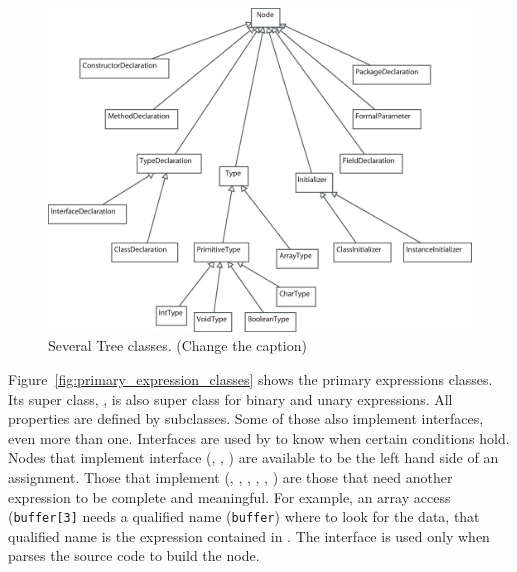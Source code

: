 \begin{figure}[!htb]
\begin{center}
\includegraphics[width=\textwidth]{images/several.eps}
\caption{Several Tree classes. (Change the caption)}
\label{fig:several_tree_classes}
\end{center}
\end{figure}

Figure~\ref{fig:primary_expression_classes} shows the primary expressions classes. Its super class, , is also super class for binary and unary expressions. All properties are defined by  subclasses. Some of those also implement interfaces, even more than one. Interfaces are used by \djava{} to know when certain conditions hold. Nodes that implement  interface (, , ) are available to be the left hand side of an assignment. Those that implement 
(, , , ,
, ) are those that need another expression to be complete and meaningful. For example, an array access ({\tt buffer[3]} needs a qualified name ({\tt buffer}) where to look for the data, that qualified name is the expression contained in . The interface  is used only when \djava{} parses the source code to build the  node.

